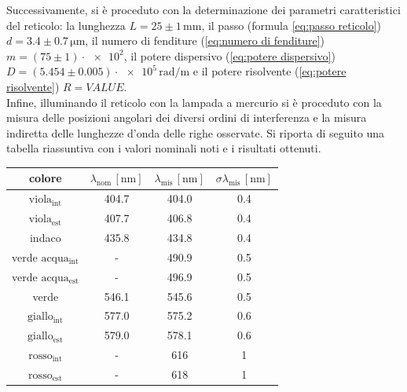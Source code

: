 \documentclass{article}
\begin{document}
        Successivamente, si è proceduto con la determinazione dei parametri caratteristici del reticolo: 
        la lunghezza $ L = 25 \pm 1 \, \mathrm{mm} $,
        il passo (formula \ref{eq:passo reticolo}) $ d = 3.4 \pm 0.7 \, \mathrm{\mu m} $, 
        il numero di fenditure (\ref{eq:numero di fenditure}) $ m = (75 \pm 1) \cdot \num{e2} $, 
        il potere dispersivo (\ref{eq:potere dispersivo}) $ D = (5.454 \pm 0.005) \cdot \num{e5} \, \mathrm{rad / m} $ e 
        il potere risolvente (\ref{eq:potere risolvente}) $ R = VALUE $. \\

        Infine, illuminando il reticolo con la lampada a mercurio si è proceduto con la misura delle posizioni angolari dei diversi ordini di interferenza
        e la misura indiretta delle lunghezze d'onda delle righe osservate. 
        Si riporta di seguito una tabella riassuntiva con i valori nominali noti e i risultati ottenuti. \\  

        \begin{table}[H]
            \centering
            \begin{tabular}{|c|c|c|c|}
                \toprule 
                colore & 
                $ \lambda_{\mathrm{nom}} \, \mathrm{[nm]} $ & 
                $ \lambda_{\mathrm{mis}} \, \mathrm{[nm]} $ & 
                $ \sigma \lambda_{\mathrm{mis}} \, \mathrm{[nm]}$ \\

                \midrule
                $ \mathrm{viola_{int}} $        & 404.7 & 404.0 & 0.4 \\
                $ \mathrm{viola_{est}} $        & 407.7 & 406.8 & 0.4 \\
                indaco                          & 435.8 & 434.8 & 0.4 \\
                verde $ \mathrm{acqua_{int}} $  & - & 490.9 & 0.5 \\  
                verde $ \mathrm{acqua_{est}} $  & - & 496.9 & 0.5 \\
                verde                           & 546.1 & 545.6 & 0.5 \\
                $ \mathrm{giallo_{int}} $       & 577.0 & 575.2 & 0.6 \\
                $ \mathrm{giallo_{est}} $       & 579.0 & 578.1 & 0.6 \\
                $ \mathrm{rosso_{int}} $        & - & 616 & 1 \\
                $ \mathrm{rosso_{est}} $        & - & 618 & 1 \\

                \bottomrule
            \end{tabular}
        \end{table}
\end{document}
